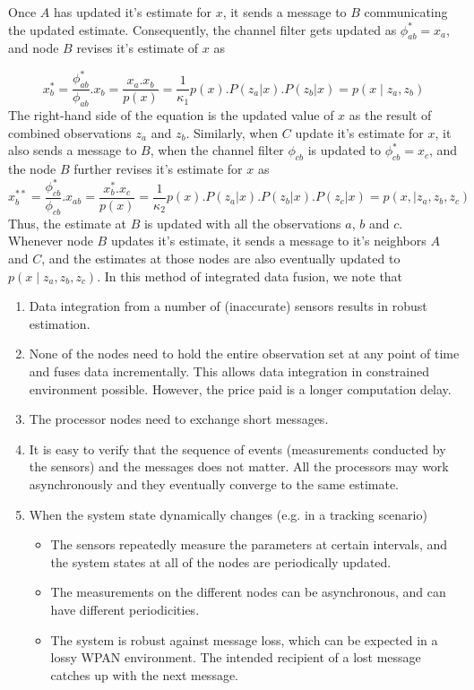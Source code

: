 \noindent
Once $A$ has updated it's estimate for $x$, it sends a message to $B$ communicating the updated estimate. Consequently, the channel 
filter gets updated as $\phi_{ab}^* = x_a$,  and node $B$ revises it's estimate of $x$ as

\begin{equation}
	x_b^* 	= \frac{\phi_{ab}^*}{\phi_{ab}}. x_b 
		= \frac{x_a.x_b}{p(x)}
		= \frac{1}{\kappa_1} p(x).P(z_a|x).P(z_b|x)
		= p(x \mid z_a,z_b)
\end{equation}
\noindent
The right-hand side of the equation is the updated value of $x$ as the result of combined observations $z_a$ and $z_b$. Similarly,
when $C$ update it's estimate for $x$, it also sends a message to $B$, when the channel filter $\phi_{cb}$ is updated to 
$\phi_{cb}^* = x_c$, and the node $B$ further revises it's estimate for $x$ as
\begin{equation}
	x_b^{**}= \frac{\phi_{cb}^*}{\phi_{cb}}. x_{ab} 
		= \frac{x_b^*.x_c}{p(x)}
		= \frac{1}{\kappa_2} p(x).P(z_a|x).P(z_b|x).P(z_c|x)
		= p(x, \mid z_a,z_b,z_c)
\end{equation}
\noindent
Thus, the estimate at $B$ is updated with all the observations $a$, $b$ and $c$. Whenever node $B$ updates it's estimate, it sends a
message to it's neighbors $A$ and $C$, and the estimates at those nodes are also eventually updated to $p(x \mid z_a, z_b, z_c)$.
%
In this method of integrated data fusion, we note that
\begin{enumerate}
	\item Data integration from a number of (inaccurate) sensors results in robust estimation.  
	\item None of the nodes need to hold the entire observation set at any point of time and fuses data incrementally. This 
		allows data integration in constrained environment possible. However, the price paid is a longer computation delay.
	\item The processor nodes need to exchange short messages. 
	\item It is easy to verify that the sequence of events (measurements conducted by the sensors) and the messages does not 
		matter. All the processors may work asynchronously and they eventually converge to the same estimate.
	\item When the system state dynamically changes (e.g. in a tracking scenario) 
		\begin{itemize}
			\item The sensors repeatedly measure the parameters at certain intervals, and the system states at all
				of the nodes are periodically updated. 
			\item The measurements on the different nodes can be asynchronous, and can have different periodicities. 
			\item The system is robust against message loss, which can be expected in a lossy WPAN environment. The 
				intended recipient of a lost message catches up with the next message.
		\end{itemize}
\end{enumerate}


